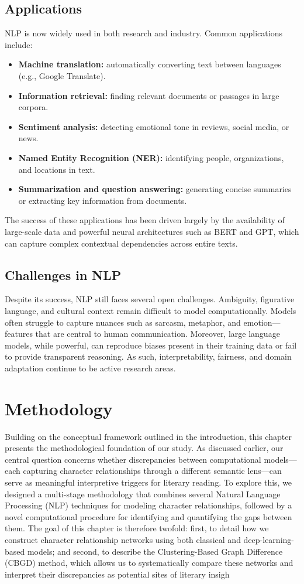 \documentclass[a4paper,12pt]{report}
\begin{document}
\section{Applications}
NLP is now widely used in both research and industry. 
Common applications include:

\begin{itemize}
    \item \textbf{Machine translation:} automatically converting text between languages (e.g., Google Translate).
    \item \textbf{Information retrieval:} finding relevant documents or passages in large corpora.
    \item \textbf{Sentiment analysis:} detecting emotional tone in reviews, social media, or news.
    \item \textbf{Named Entity Recognition (NER):} identifying people, organizations, and locations in text.
    \item \textbf{Summarization and question answering:} generating concise summaries or extracting key information from documents.
\end{itemize}

The success of these applications has been driven largely by the availability of large-scale data and powerful neural architectures such as BERT and GPT, which can capture complex contextual dependencies across entire texts.

\section{Challenges in NLP}
Despite its success, NLP still faces several open challenges. 
Ambiguity, figurative language, and cultural context remain difficult to model computationally. 
Models often struggle to capture nuances such as sarcasm, metaphor, and emotion—features that are central to human communication. 
Moreover, large language models, while powerful, can reproduce biases present in their training data or fail to provide transparent reasoning. 
As such, interpretability, fairness, and domain adaptation continue to be active research areas.
\chapter{Methodology}
Building on the conceptual framework outlined in the introduction, this chapter presents the methodological foundation of our study. As discussed earlier, our central question concerns whether discrepancies between computational models—each capturing character relationships through a different semantic lens—can serve as meaningful interpretive triggers for literary reading. To explore this, we designed a multi-stage methodology that combines several Natural Language Processing (NLP) techniques for modeling character relationships, followed by a novel computational procedure for identifying and quantifying the gaps between them.
The goal of this chapter is therefore twofold: first, to detail how we construct character relationship networks using both classical and deep-learning-based models; and second, to describe the Clustering-Based Graph Difference (CBGD) method, which allows us to systematically compare these networks and interpret their discrepancies as potential sites of literary insigh
\end{document}
